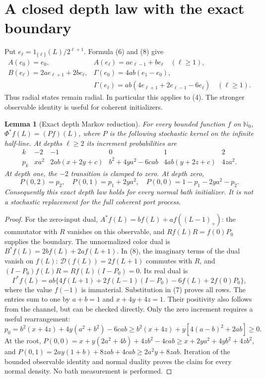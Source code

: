 \documentclass[11pt]{article}
\newtheorem{lemma}[theorem]{Lemma}
\begin{document}
\section{A closed depth law with the exact boundary}

Put $e_\ell=1_{\{\ell\}}(L)/2^{\ell+1}$. Formula (6) and (8) give
\[
\begin{array}{ll}
 A(e_0)=e_0,&A(e_\ell)=ae_{\ell-1}+be_\ell\quad(\ell\ge1),\\
 B(e_\ell)=2ae_{\ell+1}+2be_\ell,&
 \Gamma(e_0)=4ab(e_1-e_0),\\
 &\Gamma(e_\ell)=ab(4e_{\ell+1}+2e_{\ell-1}-6e_\ell)\quad(\ell\ge1).
\end{array}\tag{11}
\]
Thus radial states remain radial. In particular this applies to (4).
The stronger observable identity is useful for coherent initializers.

\begin{lemma}[Exact depth Markov reduction]\label{lem:depth}
For every bounded function $f$ on $\mathbb N_0$, $\Phi^*f(L)=(Pf)(L)$,
where $P$ is the following stochastic kernel on the infinite half-line.
At depths $\ell\ge2$ its increment probabilities are
\[
\begin{array}{c|ccccc}
 k&-2&-1&0&1&2\\\hline
 p_k&xa^2&2ab(x+2y+c)&b^2+4ya^2-6cab&4ab(y+2z+c)&4za^2.
\end{array}\tag{12}
\]
At depth one, the $-2$ transition is clamped to zero. At depth zero,
\[
 P(0,2)=p_2,\quad P(0,1)=p_1+2ya^2,\quad
 P(0,0)=1-p_1-2ya^2-p_2.
 \tag{13}
\]
Consequently this exact depth law holds for every normal bath initializer.
It is not a stochastic replacement for the full coherent port process.
\end{lemma}
\begin{proof}
For the zero-input dual,
$A^*f(L)=bf(L)+af((L-1)_+)$: the commutator with $R$ vanishes on this
observable, and $Rf(L)R=f(0)P_0$ supplies the boundary. The unnormalized
color dual is $B^*f(L)=2bf(L)+2af(L+1)$.
In (8), the imaginary terms of the dual vanish on $f(L)$:
$\mathcal D(f(L))=2f(L+1)$ commutes with $R$, and
$(I-P_0)f(L)R=Rf(L)(I-P_0)=0$. Its real dual is
\[
 \Gamma^*f(L)=ab\{4f(L+1)+2f(L-1)(I-P_0)-6f(L)+2f(0)P_0\},
 \tag{14}
\]
where the value $f(-1)$ is immaterial. Substitution in (7) proves all rows.
The entries sum to one by $a+b=1$ and $x+4y+4z=1$.
Their positivity also follows from the channel, but can be checked directly.
Only the zero increment requires a useful rearrangement:
\[
 p_0=b^2(x+4z)+4y(a^2+b^2)-6cab
 \ge b^2(x+4z)+y[4(a-b)^2+2ab]\ge0.
\]
At the root,
$P(0,0)=x+y(2a^2+4b)+4zb^2-4cab\ge x+2ya^2+4yb^2+4zb^2$,
and $P(0,1)=2ay(1+b)+8zab+4cab\ge2a^2y+8zab$.
Iteration of the bounded observable identity and normal duality proves the
claim for every normal density. No bath measurement is performed.
\end{proof}
\end{document}
